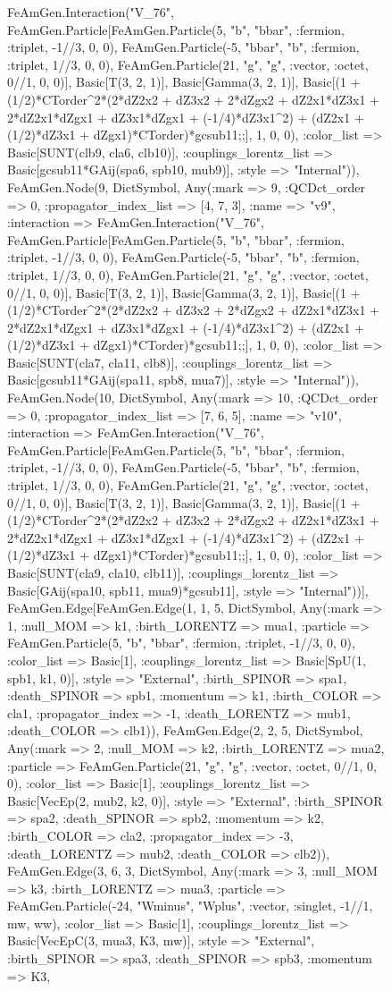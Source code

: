 \documentclass{revtex4}
\begin{document}
\begin{figure}[!htb]
\begin{center}
{FeAmGen.Interaction("V_76", FeAmGen.Particle[FeAmGen.Particle(5, "b", "bbar", :fermion, :triplet, -1//3, 0, 0), FeAmGen.Particle(-5, "bbar", "b", :fermion, :triplet, 1//3, 0, 0), FeAmGen.Particle(21, "g", "g", :vector, :octet, 0//1, 0, 0)], Basic[T(3, 2, 1)], Basic[Gamma(3, 2, 1)], Basic[(1 + (1/2)*CTorder^2*(2*dZ2x2 + dZ3x2 + 2*dZgx2 + dZ2x1*dZ3x1 + 2*dZ2x1*dZgx1 + dZ3x1*dZgx1 + (-1/4)*dZ3x1^2) + (dZ2x1 + (1/2)*dZ3x1 + dZgx1)*CTorder)*gcsub11;;], 1, 0, 0), :color_list => Basic[SUNT(clb9, cla6, clb10)], :couplings_lorentz_list => Basic[gcsub11*GAij(spa6, spb10, mub9)], :style => "Internal")), FeAmGen.Node(9, Dict{Symbol, Any}(:mark => 9, :QCDct_order => 0, :propagator_index_list => [4, 7, 3], :name => "v9", :interaction => FeAmGen.Interaction("V_76", FeAmGen.Particle[FeAmGen.Particle(5, "b", "bbar", :fermion, :triplet, -1//3, 0, 0), FeAmGen.Particle(-5, "bbar", "b", :fermion, :triplet, 1//3, 0, 0), FeAmGen.Particle(21, "g", "g", :vector, :octet, 0//1, 0, 0)], Basic[T(3, 2, 1)], Basic[Gamma(3, 2, 1)], Basic[(1 + (1/2)*CTorder^2*(2*dZ2x2 + dZ3x2 + 2*dZgx2 + dZ2x1*dZ3x1 + 2*dZ2x1*dZgx1 + dZ3x1*dZgx1 + (-1/4)*dZ3x1^2) + (dZ2x1 + (1/2)*dZ3x1 + dZgx1)*CTorder)*gcsub11;;], 1, 0, 0), :color_list => Basic[SUNT(cla7, cla11, clb8)], :couplings_lorentz_list => Basic[gcsub11*GAij(spa11, spb8, mua7)], :style => "Internal")), FeAmGen.Node(10, Dict{Symbol, Any}(:mark => 10, :QCDct_order => 0, :propagator_index_list => [7, 6, 5], :name => "v10", :interaction => FeAmGen.Interaction("V_76", FeAmGen.Particle[FeAmGen.Particle(5, "b", "bbar", :fermion, :triplet, -1//3, 0, 0), FeAmGen.Particle(-5, "bbar", "b", :fermion, :triplet, 1//3, 0, 0), FeAmGen.Particle(21, "g", "g", :vector, :octet, 0//1, 0, 0)], Basic[T(3, 2, 1)], Basic[Gamma(3, 2, 1)], Basic[(1 + (1/2)*CTorder^2*(2*dZ2x2 + dZ3x2 + 2*dZgx2 + dZ2x1*dZ3x1 + 2*dZ2x1*dZgx1 + dZ3x1*dZgx1 + (-1/4)*dZ3x1^2) + (dZ2x1 + (1/2)*dZ3x1 + dZgx1)*CTorder)*gcsub11;;], 1, 0, 0), :color_list => Basic[SUNT(cla9, cla10, clb11)], :couplings_lorentz_list => Basic[GAij(spa10, spb11, mua9)*gcsub11], :style => "Internal"))], FeAmGen.Edge[FeAmGen.Edge(1, 1, 5, Dict{Symbol, Any}(:mark => 1, :null_MOM => k1, :birth_LORENTZ => mua1, :particle => FeAmGen.Particle(5, "b", "bbar", :fermion, :triplet, -1//3, 0, 0), :color_list => Basic[1], :couplings_lorentz_list => Basic[SpU(1, spb1, k1, 0)], :style => "External", :birth_SPINOR => spa1, :death_SPINOR => spb1, :momentum => k1, :birth_COLOR => cla1, :propagator_index => -1, :death_LORENTZ => mub1, :death_COLOR => clb1)), FeAmGen.Edge(2, 2, 5, Dict{Symbol, Any}(:mark => 2, :null_MOM => k2, :birth_LORENTZ => mua2, :particle => FeAmGen.Particle(21, "g", "g", :vector, :octet, 0//1, 0, 0), :color_list => Basic[1], :couplings_lorentz_list => Basic[VecEp(2, mub2, k2, 0)], :style => "External", :birth_SPINOR => spa2, :death_SPINOR => spb2, :momentum => k2, :birth_COLOR => cla2, :propagator_index => -3, :death_LORENTZ => mub2, :death_COLOR => clb2)), FeAmGen.Edge(3, 6, 3, Dict{Symbol, Any}(:mark => 3, :null_MOM => k3, :birth_LORENTZ => mua3, :particle => FeAmGen.Particle(-24, "Wminus", "Wplus", :vector, :singlet, -1//1, mw, ww), :color_list => Basic[1], :couplings_lorentz_list => Basic[VecEpC(3, mua3, K3, mw)], :style => "External", :birth_SPINOR => spa3, :death_SPINOR => spb3, :momentum => K3, }
\end{center}
\end{figure}
\end{document}
